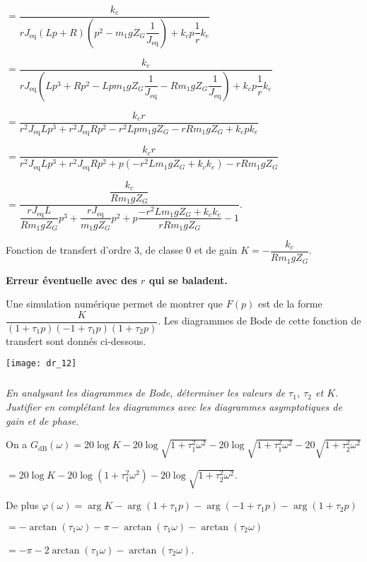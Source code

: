 \begin{multicols}{2}
\begin{corrige}
$=\dfrac{k_c }{ r J_{\text{eq}} \left(Lp + R\right) \left(p^2-m_1gZ_G\dfrac{1}{J_{\text{eq}}} \right)+k_c p\dfrac{1}{r} k_e} $


$=\dfrac{k_c }{ r J_{\text{eq}}  \left(Lp^3 + Rp^2-Lpm_1gZ_G\dfrac{1}{J_{\text{eq}}} - Rm_1gZ_G\dfrac{1}{J_{\text{eq}}} \right)+k_c p\dfrac{1}{r} k_e} $

$=\dfrac{k_c r}{   r^2 J_{\text{eq}}Lp^3 + r^2 J_{\text{eq}}Rp^2-r^2 Lpm_1gZ_G -r  Rm_1gZ_G +k_c p k_e} $

$=\dfrac{k_c r}{   r^2 J_{\text{eq}}Lp^3 + r^2 J_{\text{eq}}Rp^2+p\left(-r^2 Lm_1gZ_G  +k_c  k_e\right)-r  Rm_1gZ_G} $

$=\dfrac{\dfrac{k_c }{ Rm_1gZ_G}}{   \dfrac{r J_{\text{eq}}L}{ Rm_1gZ_G}p^3 + \dfrac{r J_{\text{eq}}}{  m_1gZ_G}p^2+p\dfrac{-r^2 Lm_1gZ_G  +k_c  k_e}{r  Rm_1gZ_G}-1} $.

Fonction de transfert d'ordre 3, de classe 0 et de gain $K=-\dfrac{k_c }{ Rm_1gZ_G}$.

\textbf{Erreur éventuelle avec des $r$ qui se baladent.}
\end{corrige}
\else
\fi

\ifprof
\else
Une simulation numérique permet de montrer que $F(p)$ est de la forme $\dfrac{K}{(1+ \tau_1p)(-1+ \tau_1p)(1+ \tau_2p)}$. Les diagrammes de Bode de cette fonction de transfert sont donnés ci-dessous.

\begin{center}
\texttt{[image: dr\_12]}
\end{center}
\fi


\subparagraph{} \textit{En analysant les diagrammes de Bode, déterminer les valeurs de $\tau_1$, $\tau_2$ et $K$. Justifier en complétant les diagrammes avec les diagrammes asymptotiques de
gain et de phase.}
\ifprof
\begin{corrige}
On a $G_{\text{dB}}(\omega)=20\log K - 20\log \sqrt{1+\tau_1^2\omega^2} - 20\log \sqrt{1+\tau_1^2\omega^2}-20\sqrt{1+\tau_2^2\omega^2}$ 

$=20\log K - 20\log \left(1+\tau_1^2\omega^2 \right)-20\log\sqrt{1+\tau_2^2\omega^2}$.


De plus $\varphi\left(\omega\right)=\arg K - \arg \left( 1+ \tau_1p\right)- \arg \left( -1+ \tau_1p\right)- \arg \left( 1+ \tau_2p\right)$ 

$= -\arctan\left( \tau_1 \omega\right)-\pi -\arctan\left( \tau_1 \omega\right)-\arctan\left( \tau_2 \omega\right)$

 $= -\pi-2\arctan\left( \tau_1 \omega\right)-\arctan\left( \tau_2 \omega\right)$.
 

\end{corrige}
\end{multicols}
